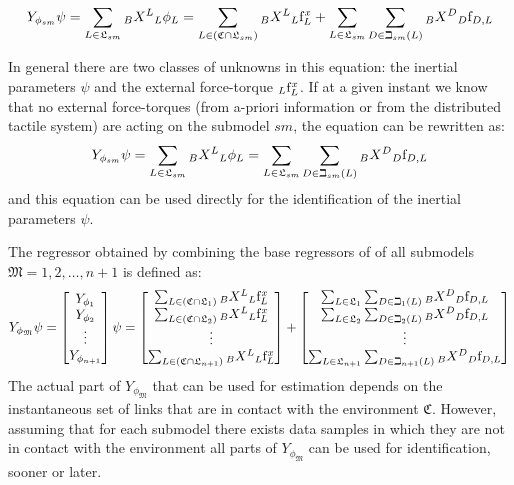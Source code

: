 \begin{equation}
    \label{eq:NEforIdentificationSubModel}
    Y_{\phi_{sm}} \psi =
    \sum_{L \in \mathfrak{L}_{sm}}  \hspace{0em}_B X^L \hspace{0em}_L \phi_L = \sum_{L \in (\mathfrak{C} \cap \mathfrak{L}_{sm}) }  \hspace{0em}_B X^L \hspace{0em}_L {\rm f}^x_L +  \sum_{L \in \mathfrak{L}_{sm}} \sum_{D \in \beth_{sm}(L)}  \hspace{0em}_B X^D \hspace{0em}_D {\rm f}_{D,L} 
\end{equation}

In general there are two classes of unknowns in this equation: the inertial parameters $\psi$ and the external force-torque $\hspace{0em}_L {\rm f}^x_L$. If at a given instant we know that no external force-torques (from a-priori information or from the distributed tactile system) are acting on the submodel $sm$, the equation can be rewritten as:
\begin{equation}
    \label{eq:NEforIdentificationSubModelNoExt}
    Y_{\phi_{sm}} \psi =
    \sum_{L \in \mathfrak{L}_{sm}}  \hspace{0em}_B X^L \hspace{0em}_L \phi_L = \sum_{L \in \mathfrak{L}_{sm}} \sum_{D \in \beth_{sm}(L)}  \hspace{0em}_B X^D \hspace{0em}_D {\rm f}_{D,L} 
\end{equation}
and this equation can be used directly for the identification of the inertial parameters $\psi$.

The regressor obtained by combining the base regressors of of all submodels $\mathfrak{M} = {1,2, \dots, n+1}$ is defined as:
\begin{equation}
\label{eq:allSubModelsRegressors}
Y_{\phi_{\mathfrak{M}}} \psi
=
\begin{bmatrix}
Y_{\phi_{1}} \\
Y_{\phi_{2}} \\
\vdots       \\ 
Y_{\phi_{n+1}} 
\end{bmatrix}
\psi 
=
\begin{bmatrix}
\sum_{L \in (\mathfrak{C} \cap \mathfrak{L}_{1}) }  \hspace{0em}_B X^L \hspace{0em}_L {\rm f}^x_L \\
\sum_{L \in (\mathfrak{C} \cap \mathfrak{L}_{2}) }  \hspace{0em}_B X^L \hspace{0em}_L {\rm f}^x_L \\
\vdots \\
\sum_{L \in (\mathfrak{C} \cap \mathfrak{L}_{n+1}) }  \hspace{0em}_B X^L \hspace{0em}_L {\rm f}^x_L
\end{bmatrix}
+
\begin{bmatrix}
\sum_{L \in \mathfrak{L}_{1}} \sum_{D \in \beth_{1}(L)}  \hspace{0em}_B X^D \hspace{0em}_D {\rm f}_{D,L} \\
\sum_{L \in \mathfrak{L}_{2}} \sum_{D \in \beth_{2}(L)}  \hspace{0em}_B X^D \hspace{0em}_D {\rm f}_{D,L} \\
\vdots \\
\sum_{L \in \mathfrak{L}_{n+1}} \sum_{D \in \beth_{n+1}(L)}  \hspace{0em}_B X^D \hspace{0em}_D {\rm f}_{D,L}
\end{bmatrix}
\end{equation}
The actual part of $Y_{\phi_{\mathfrak{M}}}$ that can be used for estimation depends on the instantaneous set of links that are in contact with the environment $\mathfrak{C}$. However, assuming that for each submodel there exists data samples in which they are not in contact with the environment all parts of $Y_{\phi_{\mathfrak{M}}}$ can be used for identification, sooner or later.

